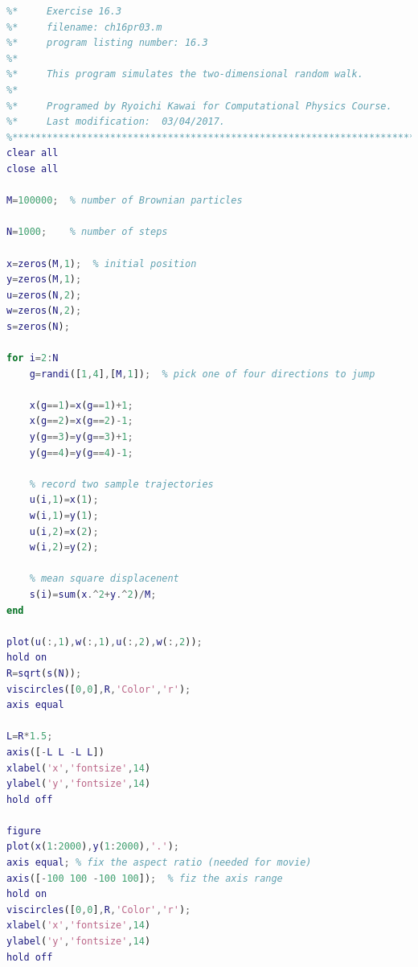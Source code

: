\noindent
\program
\label{prog:rw_2d}
\footnotesize
\begin{lstlisting}[language=matlab]
%**************************************************************************
%*     Exercise 16.3                                                      *
%*     filename: ch16pr03.m                                               *
%*     program listing number: 16.3                                       *
%*                                                                        *
%*     This program simulates the two-dimensional random walk.            *
%*                                                                        *
%*     Programed by Ryoichi Kawai for Computational Physics Course.       *
%*     Last modification:  03/04/2017.                                    *
%**************************************************************************
clear all
close all

M=100000;  % number of Brownian particles

N=1000;    % number of steps

x=zeros(M,1);  % initial position
y=zeros(M,1);
u=zeros(N,2);
w=zeros(N,2);
s=zeros(N);

for i=2:N
    g=randi([1,4],[M,1]);  % pick one of four directions to jump
    
    x(g==1)=x(g==1)+1;
    x(g==2)=x(g==2)-1;
    y(g==3)=y(g==3)+1;
    y(g==4)=y(g==4)-1;
        
    % record two sample trajectories
    u(i,1)=x(1);
    w(i,1)=y(1);
    u(i,2)=x(2);
    w(i,2)=y(2);

    % mean square displacenent
    s(i)=sum(x.^2+y.^2)/M;
end

plot(u(:,1),w(:,1),u(:,2),w(:,2));
hold on
R=sqrt(s(N));
viscircles([0,0],R,'Color','r');
axis equal

L=R*1.5;
axis([-L L -L L])
xlabel('x','fontsize',14)
ylabel('y','fontsize',14)
hold off

figure
plot(x(1:2000),y(1:2000),'.');
axis equal; % fix the aspect ratio (needed for movie)
axis([-100 100 -100 100]);  % fiz the axis range
hold on
viscircles([0,0],R,'Color','r');
xlabel('x','fontsize',14)
ylabel('y','fontsize',14)
hold off
\end{lstlisting}
\normalsize

